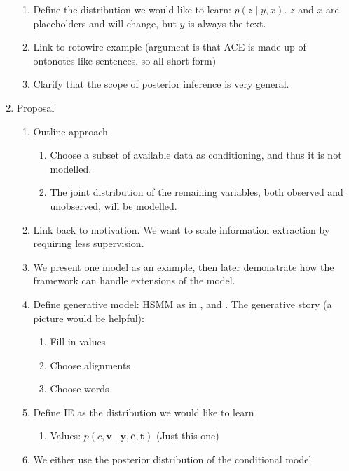\documentclass[11pt]{article}
\newcommand{\be}{\mathbf{e}}
\newcommand{\br}{\mathbf{r}}
\newcommand{\bt}{\mathbf{t}}
\newcommand{\bv}{\mathbf{v}}
\newcommand{\by}{\mathbf{y}}
\begin{document}
\begin{enumerate}
\begin{enumerate}
    \item Define the distribution we would like to learn: $p(z\mid y, x)$.
        $z$ and $x$ are placeholders and will change, but $y$ is always the text.
    \item Link to rotowire example
        (argument is that ACE is made up of ontonotes-like sentences, so all short-form)
    \item Clarify that the scope of posterior inference is very general.
    \end{enumerate}
\item Proposal
    \begin{enumerate}
    \item Outline approach
        \begin{enumerate}
        \item Choose a subset of available data as conditioning,
            and thus it is not modelled.
        \item The joint distribution of the remaining variables,
            both observed and unobserved, will be modelled.
        \end{enumerate}
    \item Link back to motivation. We want to scale information extraction
        by requiring less supervision.
    \item We present one model as an example, then later demonstrate how the framework
        can handle extensions of the model.
    \item Define generative model: HSMM as in \citep{liang2009semalign},
        and \citep{wiseman2018template}.
        The generative story (a picture would be helpful):
        \begin{enumerate}
        \item Fill in values
        \item Choose alignments
        \item Choose words
        \end{enumerate}
    \item Define IE as the distribution we would like to learn
        \begin{enumerate}
        \item Values: $p(c,\bv\mid\by,\be,\bt)$ (Just this one)
        \end{enumerate}
    \item We either use the posterior distribution of the conditional model

\end{enumerate}
\end{enumerate}
\end{document}
